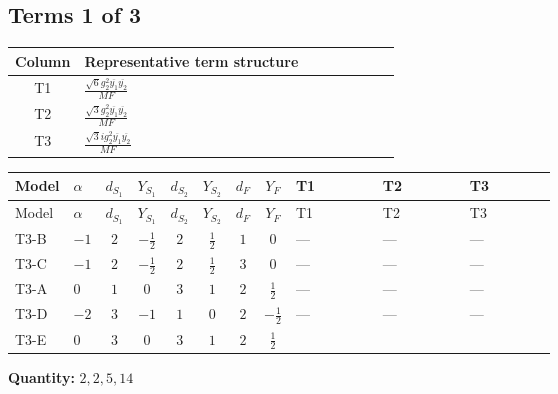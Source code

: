 \documentclass[8pt]{article}
\begin{document}
\begin{landscape}
\subsection*{Terms 1 of 3}
\begin{center}
\begin{tabular}{@{}c >{\raggedright\arraybackslash}p{0.82\linewidth}@{}}
\toprule
Column & Representative term structure \\
\midrule
T1 & \(\displaystyle \frac{\sqrt{6} g_{2}^{2} \overline{y_{1}} \overline{y_{2}}}{MF}\) \\
\midrule
T2 & \(\displaystyle \frac{\sqrt{3} g_{2}^{2} \overline{y_{1}} \overline{y_{2}}}{MF}\) \\
\midrule
T3 & \(\displaystyle \frac{\sqrt{3} i g_{2}^{2} \overline{y_{1}} \overline{y_{2}}}{MF}\) \\
\midrule
\bottomrule
\end{tabular}
\end{center}
\smallskip
\tiny
\begin{longtable}{@{}llcccccc >{\raggedright\arraybackslash}p{0.21\linewidth} >{\raggedright\arraybackslash}p{0.21\linewidth} >{\raggedright\arraybackslash}p{0.21\linewidth}@{}}
\toprule
Model & $\alpha$ & $d_{S_1}$ & $Y_{S_1}$ & $d_{S_2}$ & $Y_{S_2}$ & $d_F$ & $Y_F$ & T1 & T2 & T3 \\
\midrule
\endfirsthead
\toprule
Model & $\alpha$ & $d_{S_1}$ & $Y_{S_1}$ & $d_{S_2}$ & $Y_{S_2}$ & $d_F$ & $Y_F$ & T1 & T2 & T3 \\
\midrule
\endhead
T3-B & $-1$ & $2$ & $-\frac{1}{2}$ & $2$ & $\frac{1}{2}$ & $1$ & $0$ & --- & --- & --- \\
\midrule
T3-C & $-1$ & $2$ & $-\frac{1}{2}$ & $2$ & $\frac{1}{2}$ & $3$ & $0$ & --- & --- & --- \\
\midrule
T3-A & $0$ & $1$ & $0$ & $3$ & $1$ & $2$ & $\frac{1}{2}$ & --- & --- & --- \\
\midrule
T3-D & $-2$ & $3$ & $-1$ & $1$ & $0$ & $2$ & $-\frac{1}{2}$ & --- & --- & --- \\
\midrule
T3-E & $0$ & $3$ & $0$ & $3$ & $1$ & $2$ & $\frac{1}{2}$ & \scriptsize\adjustbox{max width=\linewidth}{$\begin{gathered} - \frac{\sqrt{6} g_{2}^{2} \overline{y_{1}} \overline{y_{2}}}{3 MF}\end{gathered}$} & \scriptsize\adjustbox{max width=\linewidth}{$\begin{gathered} - \frac{\sqrt{3} g_{2}^{2} \overline{y_{1}} \overline{y_{2}}}{6 MF}\end{gathered}$} & \scriptsize\adjustbox{max width=\linewidth}{$\begin{gathered} - \frac{49 \sqrt{3} i g_{2}^{2} \overline{y_{1}} \overline{y_{2}}}{24 MF}\end{gathered}$} \\
\midrule
\bottomrule
\end{longtable}
\clearpage
\noindent\textbf{Quantity: }$\mathrm{2,2,5,14}$\par\smallskip

\end{landscape}
\end{document}
